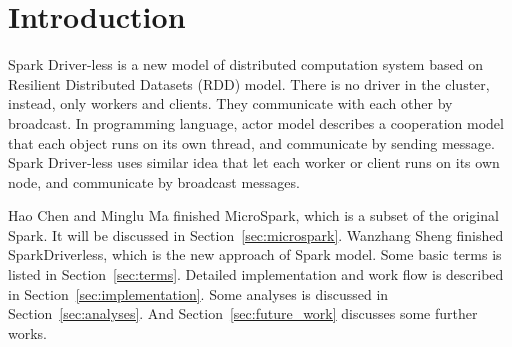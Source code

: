 
\section{Introduction} %
\label{sec:introduction}

Spark Driver-less is a new model of distributed computation system based on
Resilient Distributed Datasets (RDD)\cite{rdd} model.
There is no driver in the cluster, instead, only workers and clients.
They communicate with each other by broadcast.
In programming language, actor model describes a cooperation model that each object runs on its own thread,
and communicate by sending message.
Spark Driver-less uses similar idea that let each worker or client runs on its own node,
and communicate by broadcast messages.

Hao Chen and Minglu Ma finished MicroSpark, which is a subset of the original Spark.
It will be discussed in Section~\ref{sec:microspark}.
Wanzhang Sheng finished SparkDriverless, which is the new approach of Spark model.
Some basic terms is listed in Section~\ref{sec:terms}.
Detailed implementation and work flow is described in Section~\ref{sec:implementation}.
Some analyses is discussed in Section~\ref{sec:analyses}.
And Section~\ref{sec:future_work} discusses some further works.

